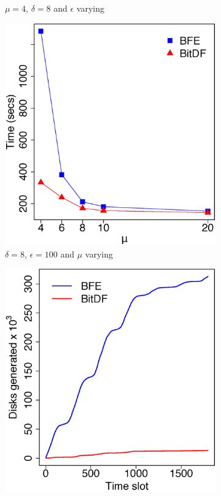 \begin{figure}
\begin{subfigure}[t]{0.25\textwidth}
        \caption{$\mu = 4$, $\delta = 8$ and $\epsilon$ varying}
        \label{fig:tdrive_vary_g}
    \end{subfigure}
    \begin{subfigure}[t]{0.25\textwidth}
        \includegraphics[width=\textwidth]{images/TDrive_l_8_g_100_varying_n.eps}
        \caption{$\delta = 8$, $\epsilon = 100$ and $\mu$ varying}
        \label{fig:tdrive_vary_n}
    \end{subfigure}
    \begin{subfigure}[t]{0.25\textwidth}
        \includegraphics[width=\textwidth]{images/TDrive_d.eps}

\end{subfigure}
\end{figure}
